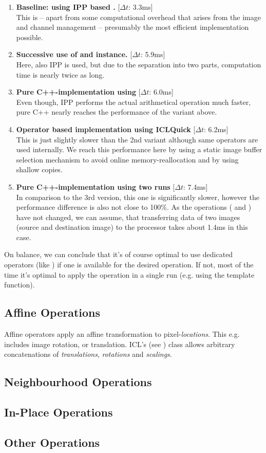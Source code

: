 \begin{enumerate}
\item \textbf{Baseline: using IPP based .} [$\Delta t$: 3.3ms]\\
This is -- apart from some computational overhead that arises from the image and channel management -- presumably the most efficient implementation possible. 
\item \textbf{Successive use of  and  instance.} [$\Delta t$: 5.9ms]\\
Here, also IPP is used, but due to the separation into two parts, computation time is nearly twice as long. 
\item \textbf{Pure C++-implementation using } [$\Delta t$: 6.0ms]\\
Even though, IPP performs the actual arithmetical operation much faster, pure C++ nearly reaches the performance of the variant above. 
\item \textbf{Operator based implementation using ICLQuick} [$\Delta t$: 6.2ms]\\
This is just slightly slower than the 2nd variant although same operators are used internally. We reach this performance here by using a static image buffer selection mechanism to avoid online memory-reallocation and by using shallow copies.
\item \textbf{Pure C++-implementation using two runs} [$\Delta t$: 7.4ms]\\
In comparison to the 3rd version, this one is significantly slower, however the performance difference is also not close to 100\%. As the operations (\icode{-} and ) have not changed, we can assume, that transferring data of two images (source and destination image) to the processor takes about 1.4ms in this case. 
\end{enumerate}

On balance, we can conclude that it's of course optimal to use dedicated operators (like ) if one is available for the desired operation. If not, most of the time it's optimal to apply the operation in a single run (e.g. using the  template function).

\subsection{Affine Operations\label{subsec:affine-ops}}
Affine operators apply an affine transformation to pixel-\emph{locations}. This e.g. includes image rotation, or translation. ICL's  (see ) class allows arbitrary concatenations of \emph{translations}, \emph{rotations} and \emph{scalings}. 

\subsection{Neighbourhood Operations\label{subsec:nbh-ops}}

\subsection{In-Place Operations\label{subsec:inplace-ops}}

\subsection{Other Operations\label{subsec:other-ops}} 
